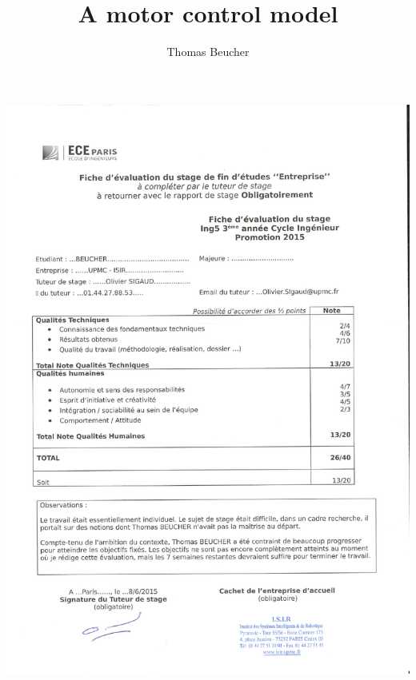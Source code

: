 \documentclass[pdftex,a4paper,11pt]{report}
\begin{document}
\title{A motor control model}
\author{Thomas Beucher}
\maketitle

\begin{center}
\includegraphics[scale=0.7]{images/eval_Beucher.pdf}
\end{center}
\end{document}
